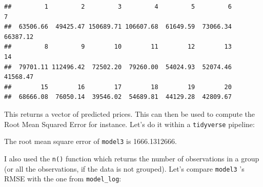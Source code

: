\documentclass[]{gitbook}
\newenvironment{Shaded}{\begin{snugshade}}{\end{snugshade}}
\newcommand{\DataTypeTok}[1]{\textcolor[rgb]{0.13,0.29,0.53}{#1}}
\newcommand{\DecValTok}[1]{\textcolor[rgb]{0.00,0.00,0.81}{#1}}
\newcommand{\KeywordTok}[1]{\textcolor[rgb]{0.13,0.29,0.53}{\textbf{#1}}}
\newcommand{\NormalTok}[1]{#1}
\newcommand{\OperatorTok}[1]{\textcolor[rgb]{0.81,0.36,0.00}{\textbf{#1}}}
\newcommand{\StringTok}[1]{\textcolor[rgb]{0.31,0.60,0.02}{#1}}
\begin{document}
\begin{verbatim}
##         1         2         3         4         5         6         7 
##  63506.66  49425.47 150689.71 106607.68  61649.59  73066.34  66387.12 
##         8         9        10        11        12        13        14 
##  79701.11 112496.42  72502.20  79260.00  54024.93  52074.46  41568.47 
##        15        16        17        18        19        20 
##  68666.08  76050.14  39546.02  54689.81  44129.28  42809.67
\end{verbatim}

This returns a vector of predicted prices. This can then be used to compute the Root Mean Squared Error
for instance. Let's do it within a \texttt{tidyverse} pipeline:

\begin{Shaded}
\end{Shaded}

The root mean square error of \texttt{model3} is 1666.1312666.

I also used the \texttt{n()} function which returns the number of observations in a group (or all the
observations, if the data is not grouped). Let's compare \texttt{model3} 's RMSE with the one from
\texttt{model\_log}:

\begin{Shaded}
\end{Shaded}
\end{document}
